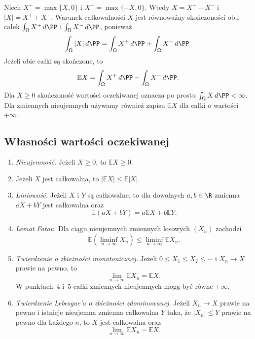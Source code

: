 \begin{uwaga}
Niech $X^+=\max\{X,0\}$ i $X^-=\max\{-X,0\}$. Wtedy
$X=X^+-X^-$ i $|X|=X^++X^-$. Warunek całkowalności $X$ jest równoważny
skończoności obu całek $\int_\Omega X^+\,d\PP$ i $\int_\Omega X^-\,d\PP$,
ponieważ
\[
  \int_\Omega |X|\,d\PP
    =\int_\Omega X^+\,d\PP+\int_\Omega X^-\,d\PP.
\]
Jeżeli obie całki są skończone, to
\[
  \mathbb{E}X=\int_\Omega X^+\,d\PP-\int_\Omega X^-\,d\PP.
\]
Dla $X\geq0$ skończoność wartości oczekiwanej oznacza po prostu
$\int_\Omega X\,d\PP<\infty$. Dla zmiennych nieujemnych używamy również
zapisu $\mathbb{E}X$ dla całki o wartości $+\infty$.
\end{uwaga}

\subsection{Własności wartości oczekiwanej}

\begin{twierdzenie}
\label{tw:wlasnosci-wartosci-oczekiwanej}
\begin{enumerate}
  \item \emph{Nieujemność.} Jeżeli $X\geq0$, to $\mathbb{E}X\geq0$.
  \item Jeżeli $X$ jest całkowalna, to $|\mathbb{E}X|\leq\mathbb{E}|X|$.
  \item \emph{Liniowość.} Jeżeli $X$ i $Y$ są całkowalne, to dla dowolnych
    $a,b\in\R$ zmienna $aX+bY$ jest całkowalna oraz
    \[
      \mathbb{E}(aX+bY)=a\mathbb{E}X+b\mathbb{E}Y.
    \]
  \item \emph{Lemat Fatou.} Dla ciągu nieujemnych zmiennych losowych
    $(X_n)$ zachodzi
    \[
      \mathbb{E}\!\left(\liminf_{n\to\infty}X_n\right)
        \leq\liminf_{n\to\infty}\mathbb{E}X_n.
    \]
  \item \emph{Twierdzenie o zbieżności monotonicznej.}
    Jeżeli $0\leq X_1\leq X_2\leq\cdots$ i $X_n\to X$ prawie na pewno,
    to
    \[
      \lim_{n\to\infty}\mathbb{E}X_n=\mathbb{E}X.
    \]
    W punktach~4 i~5 całki zmiennych nieujemnych mogą być równe $+\infty$.
  \item \emph{Twierdzenie Lebesgue'a o zbieżności zdominowanej.}
    Jeżeli $X_n\to X$ prawie na pewno i istnieje nieujemna zmienna
    całkowalna $Y$ taka, że $|X_n|\leq Y$ prawie na pewno dla każdego $n$,
    to $X$ jest całkowalna oraz
    \[
      \lim_{n\to\infty}\mathbb{E}X_n=\mathbb{E}X.
    \]
\end{enumerate}
\end{twierdzenie}

